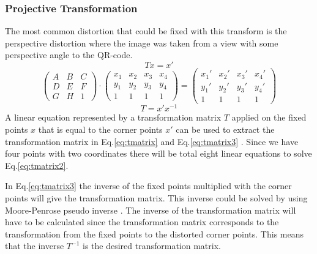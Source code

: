\documentclass[12pt,a4paper]{article}
\begin{document}
\subsubsection{Projective Transformation}
The most common distortion that could be fixed with this transform is the perspective distortion where the image was taken from a view with some perspective angle to the QR-code. 
\begin{equation}\label{eq:tmatrix}
	Tx=x{}'
\end{equation}
\begin{equation}\label{eq:tmatrix2}
	\begin{pmatrix}
		A & B & C\\ D & E & F \\ G & H  & 1 
	\end{pmatrix}\cdot 
	\begin{pmatrix}
		x_1 & x_2  & x_3  & x_4 \\ 
		y_1 & y_2 & y_3 & y_4 \\ 
		1 & 1 & 1 & 1 
	\end{pmatrix} =
	\begin{pmatrix}
		{x_1}' & {x_2}'  & {x_3}'  & {x_4}' \\ 
		{y_1}' & {y_2}' & {y_3}' & {y_4}' \\ 
		1 & 1 & 1 & 1 
	\end{pmatrix}
\end{equation}
\begin{equation}\label{eq:tmatrix3}
	T=x'x^{-1}
\end{equation}
A linear equation represented by a transformation matrix $T$ applied on the fixed points $x$ that is equal to the corner points $x'$ can be used to extract the transformation matrix in Eq.\ref{eq:tmatrix} and Eq.\ref{eq:tmatrix3} \cite{projective}.
Since we have four points with two coordinates there will be total eight linear equations to solve Eq.\ref{eq:tmatrix2}.

In Eq.\ref{eq:tmatrix3} the inverse of the fixed points multiplied with the corner points will give the transformation matrix. This inverse could be solved by using Moore-Penrose pseudo inverse \cite{penrose}. The inverse of the transformation matrix will have to be calculated since the transformation matrix corresponds to the transformation from the fixed points to the distorted corner points. This means that the inverse $T^{-1}$ is the desired transformation matrix.
\end{document}
